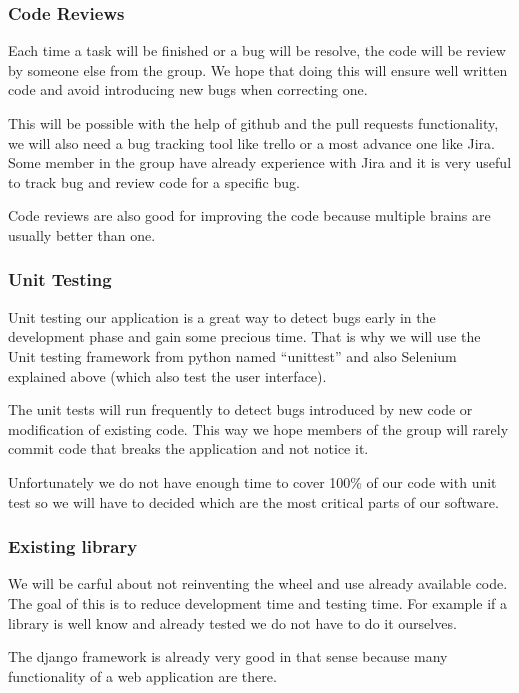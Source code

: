\documentclass[11pt, a4paper]{article}   	%
\begin{document}
\subsubsection{Code Reviews}
	
Each time a task will be finished or a bug will be resolve, the code will be review by someone else from the group. 
We hope that doing this will ensure well written code and avoid introducing new bugs when correcting one.  
 
This will be possible with the help of github and the pull requests functionality, we will also need a bug tracking tool like trello or a most advance one like Jira. Some member in the group have already experience with Jira and it is very useful to track bug and review code for a specific bug. 
 
Code reviews are also good for improving the code because multiple brains are usually better than one. 
 
\subsubsection{Unit Testing} 
 
Unit testing our application is a great way to detect bugs early in the development phase and gain some precious time. That is why we will use the Unit testing framework from python named \enquote{unittest} and also Selenium explained above (which also test the user interface). 
 
The unit tests will run frequently to detect bugs introduced by new code or modification of existing code. This way we hope members of the group will rarely commit code that breaks the application and not notice it. 
 
Unfortunately we do not have enough time to cover 100\% of our code with unit test so we will have to decided which are the most critical parts of our software. 
 
\subsubsection{Existing library} 
 
We will be carful about not reinventing the wheel and use already available code. The goal of this is to reduce development time and testing time.  
For example if a library is well know and already tested we do not have to do it ourselves. 
 
The django framework is already very good in that sense because many functionality of a web application are there.
 
\end{document}
